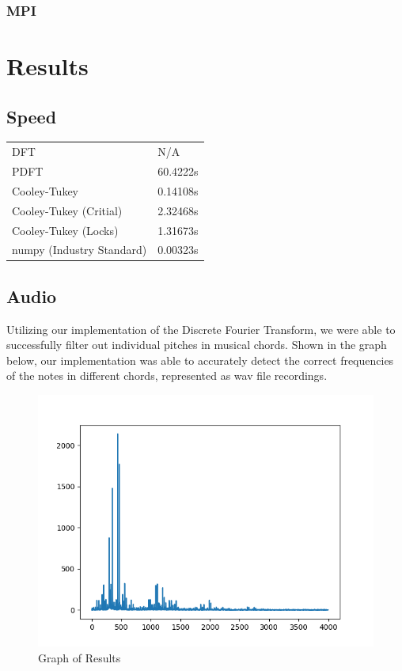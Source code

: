 \documentclass[12pt]{extarticle}
\begin{document}
	\subsubsection*{MPI}

\section*{Results}
\subsection*{Speed}

\begin{table}[]
\begin{tabular}{ll}
DFT & N/A \\
PDFT & 60.4222s \\
Cooley-Tukey & 0.14108s \\
Cooley-Tukey (Critial) & 2.32468s \\
Cooley-Tukey (Locks) & 1.31673s \\
numpy (Industry Standard) & 0.00323s
\end{tabular}
\end{table}

\subsection*{Audio}
Utilizing our implementation of the Discrete Fourier Transform, we were able to successfully filter out individual pitches in musical
chords. Shown in the graph below, our implementation was able to accurately detect the correct frequencies of the notes in different chords, 
represented as wav file recordings.

\begin{figure}[h]
  \includegraphics[scale=0.75]{./images/pitchgraph.png}
  \caption{Graph of Results}
\end{figure}
\end{document}
